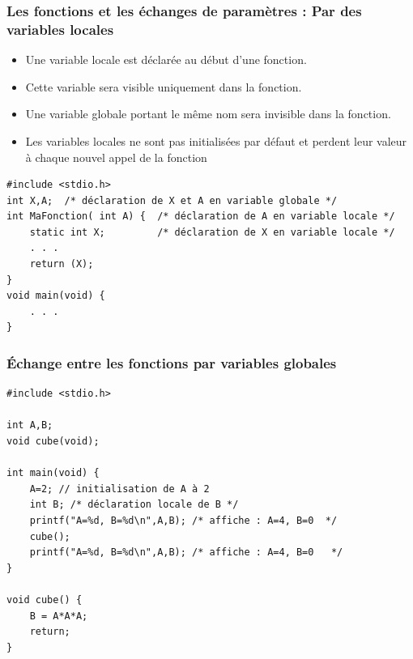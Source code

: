 \documentclass{beamer}
\begin{document}
\begin{frame}[fragile]
\frametitle{Les fonctions et les échanges de paramètres : Par des variables locales}
\begin{itemize}
\item Une variable locale est déclarée au début d'une fonction.
\item Cette variable sera visible uniquement dans la fonction.
\item Une variable globale portant le même nom sera invisible dans la fonction.
\item Les variables locales ne sont pas initialisées par défaut et perdent leur valeur à chaque nouvel appel de la fonction
\end{itemize}

\begin{verbatim}
#include <stdio.h>
int X,A;  /* déclaration de X et A en variable globale */
int MaFonction( int A) {  /* déclaration de A en variable locale */ 
    static int X;         /* déclaration de X en variable locale */
	. . .
    return (X);
}
void main(void) {
	. . .
}
\end{verbatim}

\end{frame}

\begin{frame}[fragile]
\frametitle{Échange entre les fonctions par variables globales}

\begin{verbatim}
#include <stdio.h>                         

int A,B;
void cube(void);

int main(void) {
    A=2; // initialisation de A à 2
    int B; /* déclaration locale de B */
    printf("A=%d, B=%d\n",A,B);	/* affiche : A=4, B=0  */
    cube();
    printf("A=%d, B=%d\n",A,B);	/* affiche : A=4, B=0   */	
}

void cube() { 	
    B = A*A*A;
    return;
}
\end{verbatim}

\end{frame}
\end{document}
